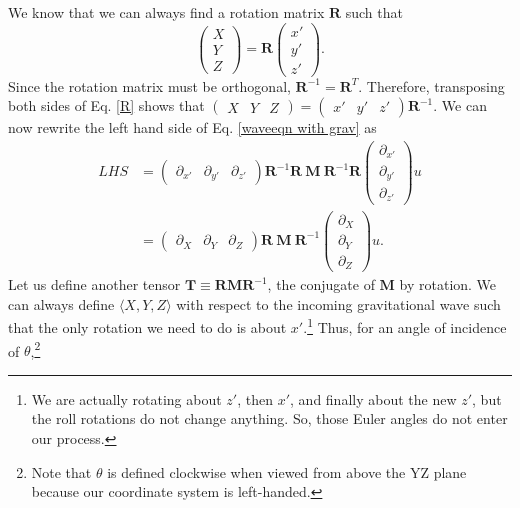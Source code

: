 \documentclass{article}
\begin{document}
We know that we can always find a rotation matrix $\textbf{R}$ such that
\begin{equation} \label{R}
\begin{pmatrix}
X \\
Y \\
Z
\end{pmatrix}=\textbf{R}\begin{pmatrix}
x\prime \\
y\prime \\
z\prime
\end{pmatrix}.
\end{equation} Since the rotation matrix must be orthogonal, $\textbf{R}^{-1}=\textbf{R}^T$. Therefore, transposing both sides of Eq. \ref{R} shows that $\begin{pmatrix} X & Y & Z\end{pmatrix} = \begin{pmatrix}x\prime & y\prime & z\prime\end{pmatrix}\textbf{R}^{-1}.$ We can now rewrite the left hand side of Eq. \ref{waveeqn with grav} as
\begin{align}
LHS &= \begin{pmatrix}\partial_{x\prime} & \partial_{y\prime} & \partial_{z\prime}\end{pmatrix} 
\textbf{R}^{-1}\textbf{R} \  \textbf{M} \ \textbf{R}^{-1}\textbf{R}
\begin{pmatrix} \partial_{x\prime} \\ \partial_{y\prime} \\ \partial_{z\prime} \end{pmatrix}
u \nonumber
\\ &= \begin{pmatrix}\partial_X & \partial_Y & \partial_Z\end{pmatrix}
\textbf{R} \  \textbf{M} \ \textbf{R}^{-1}
\begin{pmatrix} \partial_X \\ \partial_Y \\ \partial_Z \end{pmatrix}
u. \label{LHS}
\end{align}
Let us define another tensor $\textbf{T}\equiv\textbf{RMR}^{-1}$, the conjugate of $\textbf{M}$ by rotation. We can always define $\langle X,Y,Z\rangle$ with respect to the incoming gravitational wave such that the only rotation we need to do is about $x\prime$.\footnote{We are actually rotating about $z\prime$, then $x\prime$, and finally about the new $z\prime$, but the roll rotations do not change anything. So, those Euler angles do not enter our process.} Thus, for an angle of incidence of $\theta$,\footnote{Note that $\theta$ is defined clockwise when viewed from above the YZ plane because our coordinate system is left-handed.}
\end{document}
